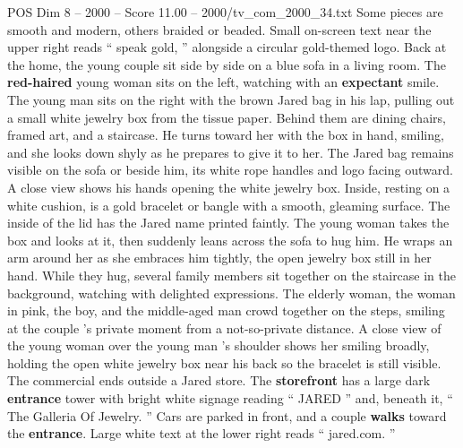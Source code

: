 \begin{textsample}{POS Dim 8 – 2000 – Score 11.00 – 2000/tv\_com\_2000\_34.txt}
Some pieces are smooth and modern, others braided or beaded.
Small on-screen text near the upper right reads “ speak gold, ” alongside a circular gold-themed logo.
Back at the home, the young couple sit side by side on a blue sofa in a living room.
The \textbf{red-haired} young woman sits on the left, watching with an \textbf{expectant} smile.
The young man sits on the right with the brown Jared bag in his lap, pulling out a small white jewelry box from the tissue paper.
Behind them are dining chairs, framed art, and a staircase.
He turns toward her with the box in hand, smiling, and she looks down shyly as he prepares to give it to her.
The Jared bag remains visible on the sofa or beside him, its white rope handles and logo facing outward.
A close view shows his hands opening the white jewelry box.
Inside, resting on a white cushion, is a gold bracelet or bangle with a smooth, gleaming surface.
The inside of the lid has the Jared name printed faintly.
The young woman takes the box and looks at it, then suddenly leans across the sofa to hug him.
He wraps an arm around her as she embraces him tightly, the open jewelry box still in her hand.
While they hug, several family members sit together on the staircase in the background, watching with delighted expressions.
The elderly woman, the woman in pink, the boy, and the middle-aged man crowd together on the steps, smiling at the couple ’s private moment from a not-so-private distance.
A close view of the young woman over the young man ’s shoulder shows her smiling broadly, holding the open white jewelry box near his back so the bracelet is still visible.
The commercial ends outside a Jared store.
The \textbf{storefront} has a large dark \textbf{entrance} tower with bright white signage reading “ JARED ” and, beneath it, “ The Galleria Of Jewelry. ” Cars are parked in front, and a couple \textbf{walks} toward the \textbf{entrance}.
Large white text at the lower right reads “ jared.com. ”

\end{textsample}
